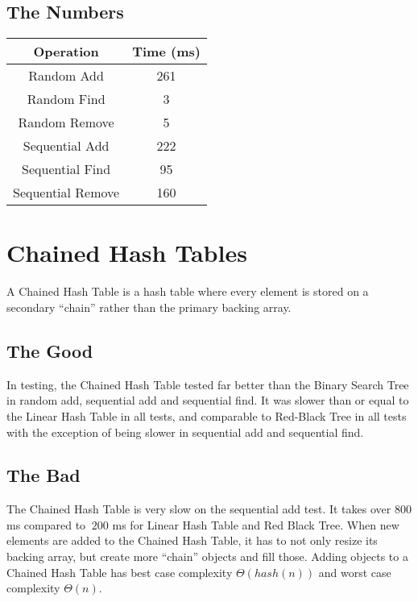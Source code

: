 \documentclass{muformallab}
\begin{document}
  \subsection{The Numbers}

  \begin{center}
    \begin{tabular}{c c}
      Operation & Time (ms) \\
      \hline
      Random Add & 261 \\
      Random Find & 3 \\
      Random Remove & 5 \\
      Sequential Add & 222 \\
      Sequential Find & 95 \\
      Sequential Remove & 160 \\
    \end{tabular}
  \end{center}

  \section{Chained Hash Tables}

  A Chained Hash Table is a hash table where every element is stored on
  a secondary ``chain'' rather than the primary backing array.

  \subsection{The Good}

  In testing, the Chained Hash Table tested far better than the Binary
  Search Tree in random add, sequential add and sequential find. It was
  slower than or equal to the Linear Hash Table in all tests, and
  comparable to Red-Black Tree in all tests with the exception of being
  slower in sequential add and sequential find.

  \subsection{The Bad}

  The Chained Hash Table is very slow on the sequential add test. It takes
  over $800$ ms compared to $~200$ ms for Linear Hash Table and Red Black
  Tree. When new elements are added to the Chained Hash Table, it has to
  not only resize its backing array, but create more ``chain'' objects and
  fill those. Adding objects to a Chained Hash Table has best case
  complexity $\Theta \left( hash \left( n \right) \right)$ and worst case
  complexity $\Theta \left( n \right)$.
\end{document}
